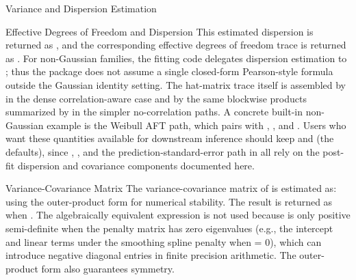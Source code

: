 \begin{Section}{Variance and Dispersion Estimation}
\begin{SubSection}{Effective Degrees of Freedom and Dispersion}
This estimated dispersion is returned as , and the
corresponding effective degrees of freedom trace is returned as
. For non-Gaussian families, the fitting code delegates
dispersion estimation to ; thus the package does
not assume a single closed-form Pearson-style formula outside the Gaussian
identity setting. The hat-matrix trace itself is assembled by
 in the dense correlation-aware case and by the
same blockwise products summarized by  in the simpler
no-correlation paths.
A concrete built-in non-Gaussian example is the Weibull AFT path, which pairs
 with ,
, and
.
Users who want these quantities available for downstream inference should
keep  and 
(the defaults), since ,
, and the prediction-standard-error path in
 all rely on the post-fit dispersion and
covariance components documented here.
\end{SubSection}


%
\begin{SubSection}{Variance-Covariance Matrix}
The variance-covariance matrix of \eqn{\tilde{\boldsymbol{\beta}}}{} is
estimated as:
using the outer-product form for numerical stability. The result is returned
as  when . The algebraically
equivalent expression  is not
used because  is only positive semi-definite when the
penalty matrix \eqn{\boldsymbol{\Lambda}}{} has zero eigenvalues (e.g., the
intercept and linear terms under the smoothing spline penalty when
 = 0), which can introduce negative diagonal
entries in finite precision arithmetic. The outer-product form also
guarantees symmetry.


\end{SubSection}
\end{Section}
